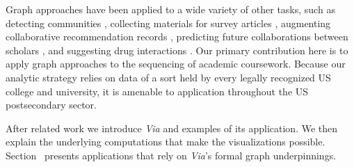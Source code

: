 Graph approaches have been applied to a wide variety of other tasks, such as detecting communities \cite{Fortunato2004}, collecting materials for survey articles \cite{ji2015}, augmenting collaborative recommendation records \cite{huang2005}, predicting future collaborations between scholars \cite{liben2007}, and suggesting drug interactions \cite{zitnik2018}. Our primary contribution here is to apply graph approaches to the sequencing of academic coursework. Because our analytic strategy relies on data of a sort held by every legally recognized US college and university, it is amenable to application throughout the US postsecondary sector. 





After related work we introduce {\em Via} and examples of its
application. We then explain the underlying computations that make the
visualizations possible. Section~ presents
applications that rely on {\em Via}'s formal graph underpinnings.




